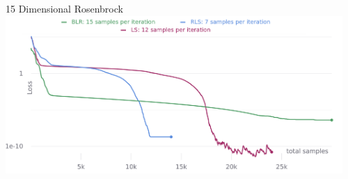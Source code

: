 \documentclass[navbarinfooter, 12pt]{sdqbeamer}
\begin{document}
\begin{frame}{15 Dimensional Rosenbrock}
  \centering
  \includegraphics[height=6cm]{figures/total_all_15dim.png}
\end{frame}




\end{document}
